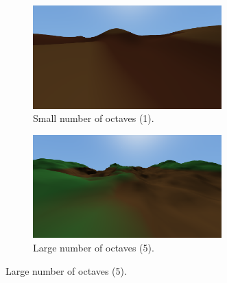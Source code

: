 \newpage
\begin{figure}[!htb]
    \centering
    \begin{subfigure}{0.45\textwidth}
        \centering
        \includegraphics[width=0.8\textwidth]{chapters/implementation/sections/terrain/resources/octaves-1.png}
        \caption{Small number of octaves (1).}
    \end{subfigure}
    \hfill
    \begin{subfigure}{0.45\textwidth}
        \centering
        \includegraphics[width=0.8\textwidth]{chapters/implementation/sections/terrain/resources/octaves-5.png}
        \caption{Large number of octaves (5).}
    \end{subfigure}


\end{figure}
